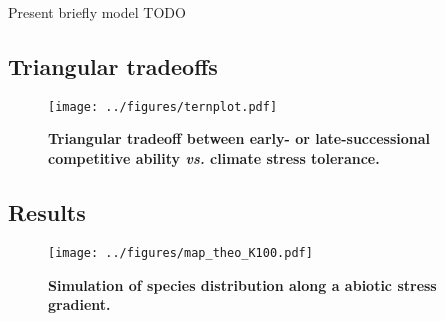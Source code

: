 \documentclass[a4paper,11pt]{article}
\begin{document}
Present briefly model TODO

\subsection{Triangular tradeoffs}

\begin{figure}[ht]
\centering
\texttt{[image: ../figures/ternplot.pdf]}
\caption{\textbf{Triangular tradeoff between early- or late-successional competitive ability \textit{vs.} climate stress tolerance.}
\label{fig:triangtrade}}
\end{figure}

\subsection{Results}

\begin{figure}[ht]
\centering
\texttt{[image: ../figures/map\_theo\_K100.pdf]}
\caption{\textbf{Simulation of species distribution along a abiotic stress gradient.}
\label{fig:mapK100}}
\end{figure}


\clearpage




\end{document}
